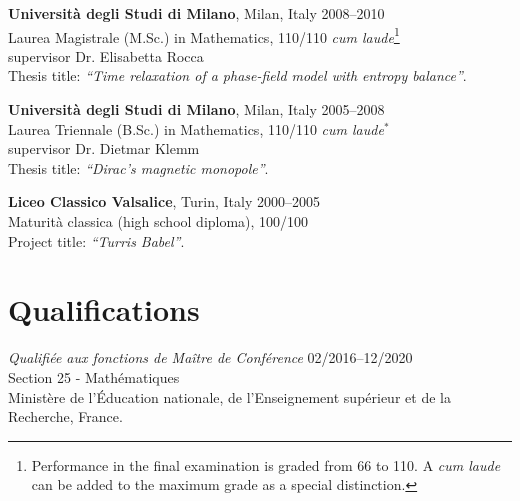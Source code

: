 \documentclass[margin]{res}
\begin{document}
\begin{resume}
{\bf Universit\`a degli Studi di Milano}, Milan, Italy \hfill 2008--2010 \\
 Laurea Magistrale (M.Sc.) in Mathematics, 110/110 \emph{cum laude}\footnote{Performance in the final examination is graded from 66 to 110. A \emph{cum laude} can be added to the maximum grade as a special distinction.} \\
 supervisor Dr. Elisabetta Rocca \\
 Thesis title: \emph{``Time relaxation of a phase-field model with entropy balance''}.
 
 {\bf Universit\`a degli Studi di Milano}, Milan, Italy \hfill 2005--2008 \\
 Laurea Triennale (B.Sc.) in Mathematics, 110/110 \emph{cum laude}$^\ast$ \\
supervisor Dr. Dietmar Klemm \\
 Thesis title: \emph{``Dirac's  magnetic monopole''}.
 
 
 {\bf Liceo Classico Valsalice}, Turin, Italy \hfill 2000--2005 \\
 Maturit\`a classica (high school diploma), 100/100 \\
 Project title: \emph{``Turris Babel''}. \\
 
  \section{Qualifications}
  
 \emph{Qualifi\'ee aux fonctions de Ma\^itre de Conf\'erence} \hfill 02/2016--12/2020 \\
Section 25 - Math\'ematiques \\
Minist\`ere de l'\'Education nationale, de l'Enseignement sup\'erieur et de la Recherche, France.   \\


 

\end{resume}
\end{document}
